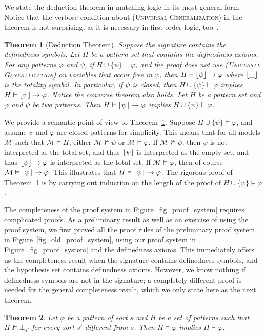 \documentclass[letter,12pt]{article}
\newtheorem{theorem}{Theorem}
\newcommand{\imp}{\to}
\newcommand{\MM}{\mathcal{M}}
\DeclarePairedDelimiter{\floor}{\lfloor}{\rfloor}
\newcommand{\prule}[1]{\textsc{(#1)}}
\newcommand{\universalgeneralization}{\prule{Universal Generalization}\xspace}
\begin{document}
We state the deduction theorem in matching logic in its most
general form.
Notice that
the verbose condition about \universalgeneralization
in the theorem is not surprising,
as it is necessary in first-order logic, too~\cite{hamilton1988logic}.
\begin{theorem}[Deduction Theorem]
\label{thm_deduction_theorem}
Suppose the signature contains the definedness symbols.
Let $H$ be a pattern set that contains
the definedness axioms.
For any patterns $\varphi$ and $\psi$,
if $H \cup \{ \psi \} \vdash \varphi$,
and the proof does not use
\universalgeneralization on variables that occur free in $\psi$,
then $H \vdash \floor{\psi} \imp \varphi$
where $\floor{\_}$ is the totality symbol.
In particular, if $\psi$ is closed,
then $H \cup \{ \psi \} \vdash \varphi$
implies $H \vdash \floor{\psi} \imp \varphi$.
Notice the converse theorem also holds.
Let $H$ be a pattern set and $\varphi$ and $\psi$ be two patterns.
Then 
$H \vdash \floor{\psi} \imp \varphi$ implies
$H \cup \{ \psi \} \vdash \varphi$.
\end{theorem}

We provide a semantic point of view to Theorem~\ref{thm_deduction_theorem}.
Suppose $H \cup \{ \psi \} \vDash \varphi$,
and assume $\psi$ and $\varphi$ are closed patterns for simplicity.
This means that for all models $\MM$ such that $\MM \vDash H$,
either $\MM \not\vDash \psi$ or $\MM \vDash \varphi$.
If $\MM \not\vDash \psi$,
then $\psi$ is not interpreted as the total set,
and thus $\floor{\psi}$ is interpreted as the empty set,
and thus $\floor{\psi} \imp \varphi$ is interpreted as the total set.
If $\MM \vDash \varphi$,
then of course $\MM \vDash \floor{\psi} \imp \varphi$.
This illustrates that $H \vDash \floor{\psi} \imp \varphi$.
The rigorous proof of Theorem~\ref{thm_deduction_theorem}
is by carrying out induction on the length of the proof of
$H \cup \{ \psi \} \vDash \varphi$.




The completeness of the proof system in Figure~\ref{fig_proof_system}
requires complicated proofs.
As a preliminary result as well as an exercise of using
the proof system, 
we first proved all the proof rules of the preliminary proof system
in Figure~\ref{fig_old_proof_system},
using our proof system in Figure~\ref{fig_proof_system}
and the definedness axioms.
This immediately offers us the completeness result
when the signature contains definedness symbols, and 
the hypothesis set contains definedness axioms.
However, we know nothing if definedness symbols are not in the signature;
a completely different proof is needed for the general completeness result,
which we only state here as the next theorem.
\begin{theorem}
\label{thm_completeness}
Let $\varphi$ be a pattern of sort $s$ and $H$ 
be a set of patterns
such that $H \not\vDash \bot_{s'}$ for every sort $s'$ different from $s$.  
Then $H \vDash \varphi$ implies $H \vdash \varphi$.
\end{theorem}
\end{document}
